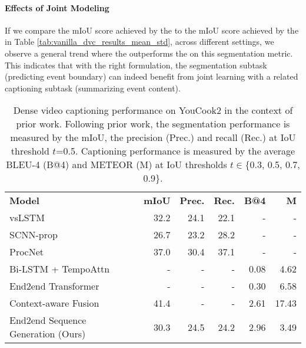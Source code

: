 \documentclass[11pt]{article}
\begin{document}
\paragraph{Effects of Joint Modeling}
If we compare the mIoU score achieved by the \segcap to the mIoU score achieved by the \segonly in Table \ref{tab:vanilla_dvc_results_mean_std},
across different settings,
we observe a general trend where the \segcap outperforms the \segonly on this segmentation metric.
This indicates that with the right formulation, the segmentation subtask (predicting event boundary) can indeed benefit from joint learning with a related captioning subtask (summarizing event content).

\begin{table}[tbp]
\begin{adjustbox}{width=\linewidth,center}
\begin{tabular}{l  r r r r r}
\cmidrule[\heavyrulewidth]{1-6}
\textbf{Model}   & \textbf{mIoU}  & \textbf{Prec.}  & \textbf{Rec.}      &   \textbf{B@4}    &   \textbf{M}   \\ 
\cmidrule[\heavyrulewidth]{1-6}
vsLSTM~\citep{Zhang2016VideoSW}                 & 32.2  & 24.1  & 22.1  & -  & -  \\
SCNN-prop~\citep{Shou2016TemporalAL}            & 26.7  & 23.2  & 28.2  & -  & -  \\
ProcNet~\citep{Zhou2018TowardsAL}               & 37.0  & 30.4  & 37.1  & -  & -  \\
Bi-LSTM + TempoAttn~\citep{Zhou2018EndtoEndDV} & -  & -  & -  & 0.08  & 4.62  \\
End2end Transformer~\citep{Zhou2018EndtoEndDV} & -  & -  & -  & 0.30  & 6.58  \\
Context-aware Fusion~\citep{Shi2019DensePC}& 41.4  & -  & -  & 2.61  & 17.43  \\
\cmidrule{1-6}
End2end Sequence Generation (Ours)    &   30.3 & 	24.5 & 	24.2 & 	2.96 & 	3.49 \\
\cmidrule[\heavyrulewidth]{1-6}
\end{tabular}
\end{adjustbox}
\caption{Dense video captioning performance on YouCook2 in the context of prior work. Following prior work, the segmentation performance is measured by the mIoU, the precision (Prec.) and recall (Rec.) at IoU threshold $t$=0.5.
Captioning performance is measured by the average BLEU-4 (B@4) and METEOR (M) at IoU thresholds $t \in$\{0.3, 0.5, 0.7, 0.9\}.
}
\label{tab:prior_work_youcook2}
\end{table}
\end{document}
